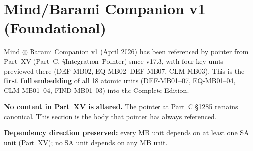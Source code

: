 \documentclass[12pt, a4paper]{article}
\begin{document}
\newpage

\section{Mind/Barami Companion v1 (Foundational)}
\label{sec:mb-v1}

\begin{keybox}[title={Integration Note: v1 First Embedding (v17.8)}]
Mind $\otimes$ Barami Companion v1 (April 2026) has been referenced
by pointer from Part~XV (Part~C, §Integration~Pointer) since v17.3,
with four key units previewed there (DEF-MB02, EQ-MB02, DEF-MB07,
CLM-MB03). This is the \textbf{first full embedding} of all 18
atomic units (DEF-MB01--07, EQ-MB01--04, CLM-MB01--04,
FIND-MB01--03) into the Complete Edition.

\textbf{No content in Part~XV is altered.} The pointer at
Part~C §1285 remains canonical. This section is the body
that pointer has always referenced.

\textbf{Dependency direction preserved:}
every MB unit depends on at least one SA unit (Part~XV);
no SA unit depends on any MB unit.
\end{keybox}


\sloppy

\end{document}
